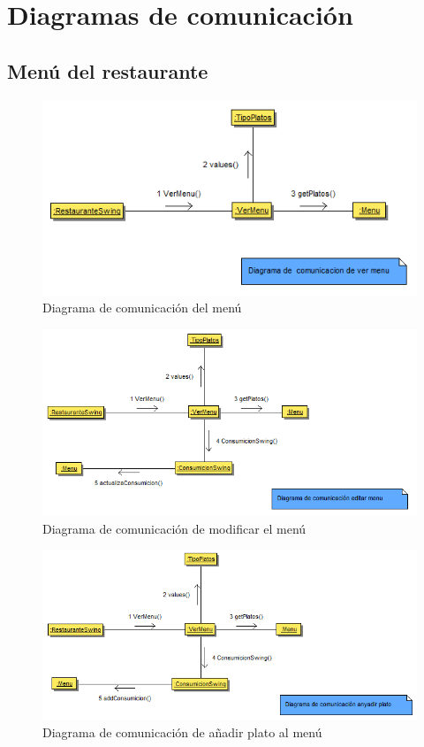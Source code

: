 \documentclass[spanish,a4paper,11pt, twoside]{report}	%
\begin{document}
	\section{Diagramas de comunicación}
		\subsection{Menú del restaurante}

		\begin{figure}[!h]
		\centering
		\includegraphics[scale=0.5]{DCvermenu.png}
		\caption{Diagrama de comunicación del menú}
		\end{figure}

		\begin{figure}[!h]
		\centering
		\includegraphics[scale=0.5]{DCeditarmenu.png}
		\caption{Diagrama de comunicación de modificar el menú}
		\end{figure}

		\begin{figure}[!h]
		\centering
		\includegraphics[scale=0.5]{DCanyadirconsumicion.png}
		\caption{Diagrama de comunicación de añadir plato al menú}
		\end{figure}
\end{document}
